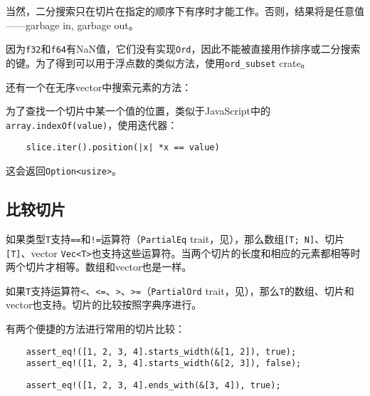 
当然，二分搜索只在切片在指定的顺序下有序时才能工作。否则，结果将是任意值——garbage in, garbage out。

因为\texttt{f32}和\texttt{f64}有NaN值，它们没有实现\texttt{Ord}，因此不能被直接用作排序或二分搜索的键。为了得到可以用于浮点数的类似方法，使用\texttt{ord\_subset} crate。

还有一个在无序vector中搜索元素的方法：


为了查找一个切片中某一个值的位置，类似于JavaScript中的\texttt{array.indexOf(value)}，使用迭代器：
\begin{verbatim}
    slice.iter().position(|x| *x == value)
\end{verbatim}
这会返回\texttt{Option<usize>}。

\subsection{比较切片}
如果类型\texttt{T}支持\texttt{==}和\texttt{!=}运算符（\texttt{PartialEq} trait，见），那么数组\texttt{[T; N]}、切片\texttt{[T]}、vector \texttt{Vec<T>}也支持这些运算符。当两个切片的长度和相应的元素都相等时两个切片才相等。数组和vector也是一样。

如果\texttt{T}支持运算符\texttt{<}、\texttt{<=}、\texttt{>}、\texttt{>=}（\texttt{PartialOrd} trait，见），那么\texttt{T}的数组、切片和vector也支持。切片的比较按照字典序进行。

有两个便捷的方法进行常用的切片比较：

\begin{verbatim}
    assert_eq!([1, 2, 3, 4].starts_width(&[1, 2]), true);
    assert_eq!([1, 2, 3, 4].starts_width(&[2, 3]), false);
\end{verbatim}

\begin{verbatim}
    assert_eq!([1, 2, 3, 4].ends_with(&[3, 4]), true);
\end{verbatim}

